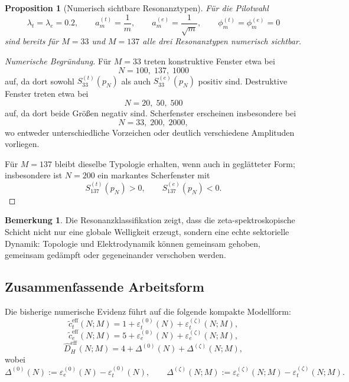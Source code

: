 \documentclass[12pt,a4paper]{article}
\newtheorem{proposition}[satz]{Proposition}
\theoremstyle{definition}
\newtheorem{bemerkung}[satz]{Bemerkung}
\begin{document}
	\begin{proposition}[Numerisch sichtbare Resonanztypen]
		Für die Pilotwahl
		\[
		\lambda_t=\lambda_e=0.2,
		\qquad
		a_m^{(t)}=\frac1m,
		\qquad
		a_m^{(e)}=\frac1{\sqrt m},
		\qquad
		\phi_m^{(t)}=\phi_m^{(e)}=0
		\]
		sind bereits für \(M=33\) und \(M=137\) alle drei Resonanztypen numerisch sichtbar.
	\end{proposition}
	
	\begin{proof}[Numerische Begründung]
		Für \(M=33\) treten konstruktive Fenster etwa bei
		\[
		N=100,\;137,\;1000
		\]
		auf, da dort sowohl \(S_{33}^{(t)}(p_N)\) als auch \(S_{33}^{(e)}(p_N)\) positiv sind.  
		Destruktive Fenster treten etwa bei
		\[
		N=20,\;50,\;500
		\]
		auf, da dort beide Größen negativ sind.  
		Scherfenster erscheinen insbesondere bei
		\[
		N=33,\;200,\;2000,
		\]
		wo entweder unterschiedliche Vorzeichen oder deutlich verschiedene Amplituden vorliegen.
		
		Für \(M=137\) bleibt dieselbe Typologie erhalten, wenn auch in geglätteter Form; insbesondere ist \(N=200\) ein markantes Scherfenster mit
		\[
		S_{137}^{(t)}(p_N)>0,
		\qquad
		S_{137}^{(e)}(p_N)<0.
		\]
	\end{proof}
	
	\begin{bemerkung}
		Die Resonanzklassifikation zeigt, dass die zeta-spektroskopische Schicht nicht nur eine globale Welligkeit erzeugt, sondern eine echte sektorielle Dynamik: Topologie und Elektrodynamik können gemeinsam gehoben, gemeinsam gedämpft oder gegeneinander verschoben werden.
	\end{bemerkung}
	
	\subsection{Zusammenfassende Arbeitsform}
	
	Die bisherige numerische Evidenz führt auf die folgende kompakte Modellform:
	\[
	\tilde c_t^{\mathrm{eff}}(N;M)
	=
	1+\varepsilon_t^{(0)}(N)+\varepsilon_t^{(\zeta)}(N;M),
	\]
	\[
	\tilde c_e^{\mathrm{eff}}(N;M)
	=
	5+\varepsilon_e^{(0)}(N)+\varepsilon_e^{(\zeta)}(N;M),
	\]
	\[
	\widehat D_H^{\mathrm{eff}}(N;M)
	=
	4+\Delta^{(0)}(N)+\Delta^{(\zeta)}(N;M),
	\]
	wobei
	\[
	\Delta^{(0)}(N):=\varepsilon_e^{(0)}(N)-\varepsilon_t^{(0)}(N),
	\qquad
	\Delta^{(\zeta)}(N;M):=\varepsilon_e^{(\zeta)}(N;M)-\varepsilon_t^{(\zeta)}(N;M).
	\]
	
\end{document}
